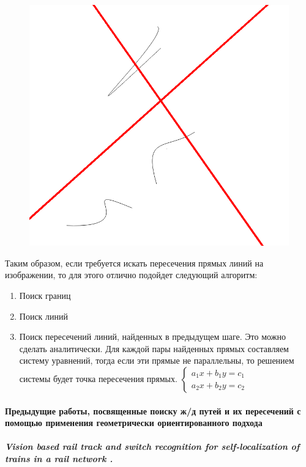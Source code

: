 \begin{enumerate}
\begin{figure}[!h]
\begin{minipage}{0.45\textwidth}
			\caption[Y]{}
			\label{fig:canny_ex}
		\end{minipage}
		\begin{minipage}{0.45\textwidth}
			\centering
			\includegraphics[width=0.7\linewidth]{pictures/hough_ex}
			\caption[X]{}
			\label{fig:hough_ex}
		\end{minipage}
	\end{figure}
\end{enumerate}

Таким образом, если требуется искать пересечения прямых линий на изображении, то для этого отлично подойдет следующий алгоритм:
\begin{enumerate}
	\item Поиск границ \cite{b:canny}
	\item Поиск линий \cite{b:hough_transform}
	\item Поиск пересечений линий, найденных в предыдущем шаге. Это можно сделать аналитически. Для каждой пары найденных прямых составляем систему уравнений, тогда если эти прямые не параллельны, то решением системы будет точка пересечения прямых.
	$
	\begin{cases}
	a_1x + b_1y = c_1 
	\\
	a_2x + b_2y = c_2 
	\end{cases}
	$
\end{enumerate}

\paragraph{Предыдущие работы, посвященные поиску ж/д путей и их пересечений с помощью применения геометрически ориентированного подхода}

\subparagraph{Vision based rail track and switch recognition for self-localization of trains in a rail network \cite{b:hough_work1}.}

